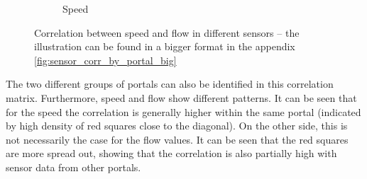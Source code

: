 \begin{figure}[H]
\begin{subfigure}{0.49 \linewidth}
			\caption{Speed}
		\end{subfigure}
		\caption{Correlation between speed and flow in different sensors -- the illustration can be found in a bigger format in the appendix \ref{fig:sensor_corr_by_portal_big}}
		\label{fig:sensor_corr_by_portal}
	\end{figure}
	\noindent The two different groups of portals can also be identified in this correlation matrix.
	Furthermore, speed and flow show different patterns. It can be seen that for the speed the correlation is generally higher within the same portal (indicated by high density of red squares close to the diagonal). On the other side, this is not necessarily the case for the flow values. It can be seen that the red squares are more spread out, showing that the correlation is also partially high with sensor data from other portals.
